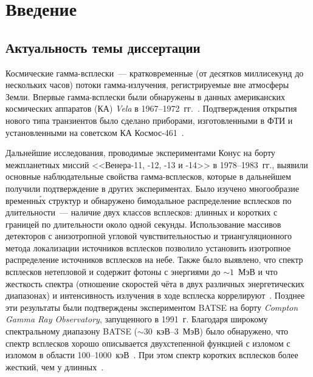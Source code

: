 \chapter*{Введение}					

\section*{Актуальность темы диссертации}

Космические гамма-всплески~--- кратковременные (от десятков миллисекунд до нескольких часов) 
потоки гамма-излучения, регистрируемые вне атмосферы Земли. Впервые гамма-всплески 
были обнаружены в данных американских космических аппаратов (КА) \textit{Vela} в 1967--1972~гг.~\citep{Klebesadel_1973ApJ}. 
Подтверждения открытия нового типа транзиентов было сделано приборами, изготовленными 
в ФТИ и установленными на советском КА Космос-461~\citep{Mazets_1974PZETF_ru}. 

Дальнейшие исследования, проводимые экспериментами Конус на борту 
межпланетных миссий <<Венера-11, -12, -13 и -14>> в 1978--1983~гг., выявили 
основные наблюдательные свойства гамма-всплесков, которые в дальнейшем получили 
подтверждение в других экспериментах. Было изучено многообразие временн\'{ы}х структур
и обнаружено бимодальное распределение всплесков по длительности~--- 
наличие двух классов всплесков: длинных и коротких с границей по длительности около одной секунды.
Использование массивов детекторов с анизотропной угловой чувствительностью
и триангуляционного метода локализации источников всплесков позволило установить 
изотропное распределение источников всплесков на небе. Также было выявлено,
что спектр всплесков нетепловой и содержит фотоны с энергиями до $\sim 1$~МэВ и 
что жесткость спектра (отношение скоростей чёта в двух различных энергетических диапазонах) 
и интенсивность излучения в ходе всплеска 
коррелируют~\citep{Mazets_1981_part_1,Golenetskii_1983Natur}.
Позднее эти результаты были подтверждены экспериментом BATSE на борту 
\textit{Compton Gamma Ray Observatory}, запущенного в 1991~г. 
Благодаря широкому спектральному диапазону BATSE ($\sim30$~кэВ--3~МэВ) было обнаружено, 
что спектр всплесков хорошо описывается двухстепенной функцией с изломом с изломом
в области 100--1000~кэВ~\citep{Band_1993ApJ}. При этом спектр 
коротких всплесков более жесткий, чем у длинных~\citep{Kouveliotou_1993}. 


